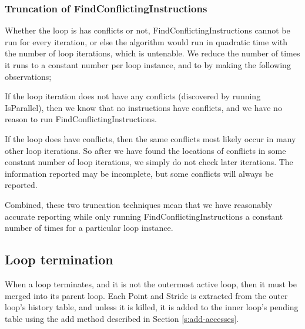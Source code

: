 \documentclass[12pt,twoside]{reedthesis}
\begin{document}
			
			
		
		\subsubsection{Truncation of FindConflictingInstructions}
			
			Whether the loop is has conflicts or not, FindConflictingInstructions cannot be run for every iteration, or else the algorithm would run in quadratic time with the number of loop iterations, which is untenable. We reduce the number of times it runs to a constant number per loop instance, and to  by making the following observations; 
			
			If the loop iteration does not have any conflicts (discovered by running IsParallel), then we know that no instructions have conflicts, and we have no reason to run FindConflictingInstructions. 
			
			If the loop does have conflicts, then the same conflicts most likely occur in many other loop iterations. So after we have found the locations of conflicts in some constant number of loop iterations, we simply do not check later iterations. The information reported may be incomplete, but some conflicts will always be reported.%
			
			Combined, these two truncation techniques mean that we have reasonably accurate reporting while only running FindConflictingInstructions a constant number of times for a particular loop instance.
			
			
	\subsection{Loop termination}
		
			When a loop terminates, and it is not the outermost active loop, then it must be merged into its parent loop. Each Point and Stride is extracted from the outer loop's history table, and unless it is killed, it is added to the inner loop's pending table using the add method described in Section \ref{s:add-accesses}. 
		
\end{document}
